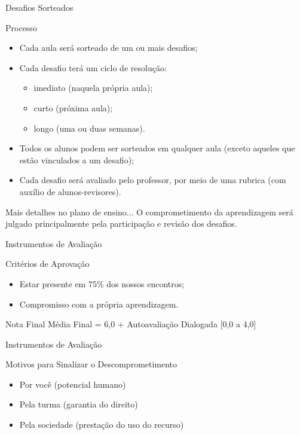 \documentclass[xcolor=dvipsnames,table]{beamer}
\begin{document}
\begin{frame}{Desafios Sorteados}
    \begin{block}{Processo}
        \begin{itemize}
            \item Cada aula será sorteado de um ou mais desafios;
            \item Cada desafio terá um ciclo de resolução:
                \begin{itemize}
                    \item imediato (naquela própria aula);
                    \item curto (próxima aula);
                    \item longo (uma ou duas semanas).
                \end{itemize}
            \item Todos os alunos podem ser sorteados em qualquer aula (exceto aqueles que estão vinculados a um desafio);
            \item Cada desafio será avaliado pelo professor, por meio de uma rubrica (com auxílio de alunos-revisores).
        \end{itemize}        
    \end{block} \pause

    \begin{exampleblock}{Mais detalhes no plano de ensino...}
        O comprometimento da aprendizagem será julgado principalmente pela participação e revisão dos desafios.
    \end{exampleblock}
    
\end{frame}

\begin{frame}{Instrumentos de Avaliação}
    \begin{block}{Critérios de Aprovação}
    	\begin{itemize}
    		\item Estar presente em 75\% dos nossos encontros;
    		\item Compromisso com a própria aprendizagem.
    	\end{itemize}
    \end{block} \pause
    \begin{exampleblock}{Nota Final}
    	Média Final = 6,0 + Autoavaliação Dialogada [0,0 a 4,0]
    \end{exampleblock}
\end{frame}

\begin{frame}{Instrumentos de Avaliação}
    \begin{block}{Motivos para Sinalizar o Descomprometimento}
        \begin{itemize}
            \item Por você (potencial humano)
            \item Pela turma (garantia do direito)
            \item Pela sociedade (prestação do uso do recurso)
        \end{itemize}
    \end{block}
\end{frame}
\end{document}
